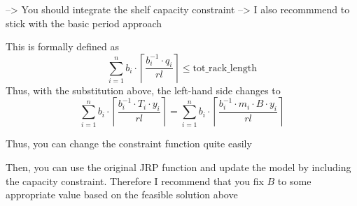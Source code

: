 \documentclass[
]{article}
\newenvironment{Shaded}{\begin{snugshade}}{\end{snugshade}}
\newcommand{\ControlFlowTok}[1]{\textcolor[rgb]{0.13,0.29,0.53}{\textbf{#1}}}
\newcommand{\DataTypeTok}[1]{\textcolor[rgb]{0.13,0.29,0.53}{#1}}
\newcommand{\KeywordTok}[1]{\textcolor[rgb]{0.13,0.29,0.53}{\textbf{#1}}}
\newcommand{\NormalTok}[1]{#1}
\newcommand{\OperatorTok}[1]{\textcolor[rgb]{0.81,0.36,0.00}{\textbf{#1}}}
\newcommand{\StringTok}[1]{\textcolor[rgb]{0.31,0.60,0.02}{#1}}
\begin{document}
--\textgreater{} You should integrate the shelf capacity constraint
--\textgreater{} I also recommmend to stick with the basic period
approach

This is formally defined as
\[ \sum_{i=1}^n b_i \cdot \left\lceil\frac{b^{-1}_i \cdot q_i}{rl} \right \rceil \leq \text{tot_rack_length}\]
Thus, with the substitution above, the left-hand side changes to
\[ \sum_{i=1}^n b_i \cdot \left\lceil\frac{b^{-1}_i \cdot T_i \cdot y_i}{rl} \right \rceil = \sum_{i=1}^n b_i \cdot \left\lceil\frac{b^{-1}_i \cdot m_i \cdot B \cdot y_i}{rl} \right \rceil\]

Thus, you can change the constraint function quite easily

\begin{Shaded}
\end{Shaded}

Then, you can use the original JRP function and update the model by
including the capacity constraint. Therefore I recommend that you fix
\(B\) to some appropriate value based on the feasible solution above
\end{document}
